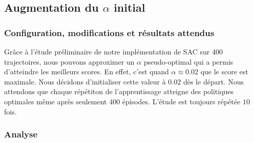 \subsection{Augmentation du $\alpha$ initial}

\subsubsection{Configuration, modifications et résultats attendus}

Grâce à l'étude préliminaire de notre implémentation de SAC sur 400
trajectoires, nous pouvons approximer un $\alpha$ pseudo-optimal qui a permis
d'atteindre les meilleurs scores. En effet, c'est quand $\alpha \approx 0.02$
que le score est maximale. Nous décidons d'initialiser cette valeur à $0.02$ dès
le départ. Nous attendons que chaque répétiton de l'apprentissage atteigne des
politiques optimales même après seulement 400 épisodes. L'étude est toujours répétée $10$ fois.

\subsubsection{Analyse}

